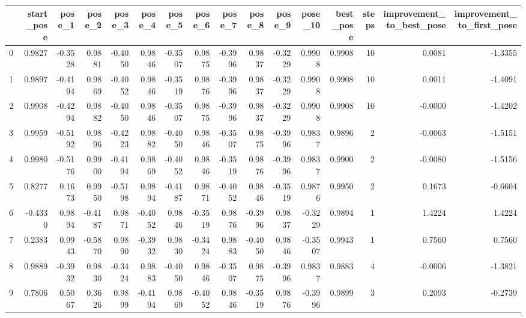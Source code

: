 \begin{tabular}{lrrrrrrrrrrrrrrr}
\toprule
{} &  start\_pose &  pose\_1 &  pose\_2 &  pose\_3 &  pose\_4 &  pose\_5 &  pose\_6 &  pose\_7 &  pose\_8 &  pose\_9 &  pose\_10 &  best\_pose &  steps &  improvement\_to\_best\_pose &  improvement\_to\_first\_pose \\
\midrule
0  &      0.9827 & -0.3528 &  0.9881 & -0.4050 &  0.9846 & -0.3507 &  0.9875 & -0.3996 &  0.9837 & -0.3229 &   0.9908 &     0.9908 &     10 &                    0.0081 &                    -1.3355 \\
1  &      0.9897 & -0.4194 &  0.9869 & -0.4052 &  0.9846 & -0.3519 &  0.9876 & -0.3996 &  0.9837 & -0.3229 &   0.9908 &     0.9908 &     10 &                    0.0011 &                    -1.4091 \\
2  &      0.9908 & -0.4294 &  0.9882 & -0.4050 &  0.9846 & -0.3507 &  0.9875 & -0.3996 &  0.9837 & -0.3229 &   0.9908 &     0.9908 &     10 &                   -0.0000 &                    -1.4202 \\
3  &      0.9959 & -0.5192 &  0.9896 & -0.4223 &  0.9882 & -0.4050 &  0.9846 & -0.3507 &  0.9875 & -0.3996 &   0.9837 &     0.9896 &      2 &                   -0.0063 &                    -1.5151 \\
4  &      0.9980 & -0.5176 &  0.9900 & -0.4194 &  0.9869 & -0.4052 &  0.9846 & -0.3519 &  0.9876 & -0.3996 &   0.9837 &     0.9900 &      2 &                   -0.0080 &                    -1.5156 \\
5  &      0.8277 &  0.1673 &  0.9950 & -0.5198 &  0.9894 & -0.4187 &  0.9871 & -0.4052 &  0.9846 & -0.3519 &   0.9876 &     0.9950 &      2 &                    0.1673 &                    -0.6604 \\
6  &     -0.4330 &  0.9894 & -0.4187 &  0.9871 & -0.4052 &  0.9846 & -0.3519 &  0.9876 & -0.3996 &  0.9837 &  -0.3229 &     0.9894 &      1 &                    1.4224 &                     1.4224 \\
7  &      0.2383 &  0.9943 & -0.5870 &  0.9890 & -0.3932 &  0.9830 & -0.3424 &  0.9883 & -0.4050 &  0.9846 &  -0.3507 &     0.9943 &      1 &                    0.7560 &                     0.7560 \\
8  &      0.9889 & -0.3932 &  0.9830 & -0.3424 &  0.9883 & -0.4050 &  0.9846 & -0.3507 &  0.9875 & -0.3996 &   0.9837 &     0.9883 &      4 &                   -0.0006 &                    -1.3821 \\
9  &      0.7806 &  0.5067 &  0.3626 &  0.9899 & -0.4194 &  0.9869 & -0.4052 &  0.9846 & -0.3519 &  0.9876 &  -0.3996 &     0.9899 &      3 &                    0.2093 &                    -0.2739 \\

\end{tabular}
